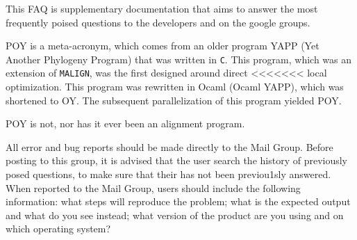 This FAQ is supplementary documentation that aims to answer the most frequently poised questions to 
the \poy developers and on the \poy google groups.

\renewcommand{\cftdotsep}{\cftnodots} %
\listofquestions
\newpage


{POY is a meta-acronym, which comes from an older program YAPP (Yet Another Phylogeny Program) that 
was written in \texttt{C}.  This program, which was an extension of \texttt{MALIGN}, was the first designed around direct 
<<<<<<< local
optimization.  This program was rewritten in Ocaml (Ocaml YAPP), which was shortened to OY.  
The subsequent parallelization of this program yielded POY.}

{POY is not, nor has it ever been an alignment program.}

{All error and bug reports should be made directly to the \poy Mail Group. Before posting to this group, it is advised that the 
user search the history of previously posed questions, to make sure that their has not been previou1sly answered.
When reported to the Mail Group, users should include the following information: what steps will 
reproduce the problem; what is the expected output and what do you see instead;  what version of 
the product are you using and on which operating system?}

